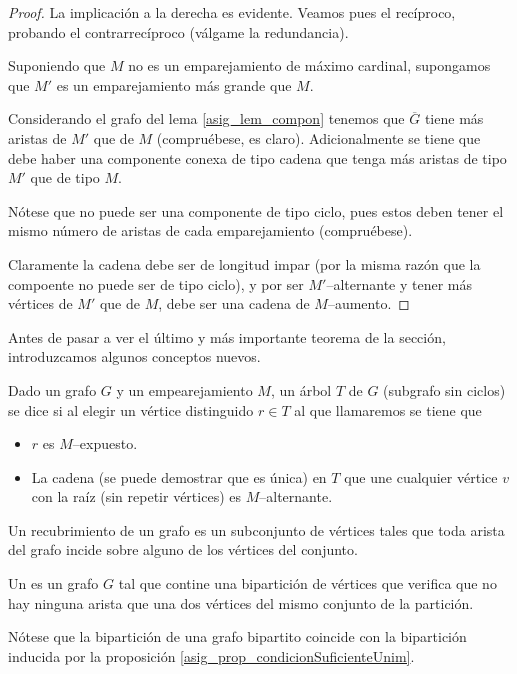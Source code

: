 \begin{proof}
	La implicación a la derecha es evidente. Veamos pues el recíproco, probando el contrarrecíproco (válgame la redundancia).
	
	Suponiendo que $M$ no es un emparejamiento de máximo cardinal, supongamos que $M'$ es un emparejamiento más grande que $M$.
	
	Considerando el grafo del lema \ref{asig_lem_compon} tenemos que $\overline{G}$ tiene más aristas de $M'$ que de $M$ (compruébese, es claro). Adicionalmente se tiene que debe haber una componente conexa de tipo cadena que tenga más aristas de tipo $M'$ que de tipo $M$.
	
	Nótese que no puede ser una componente de tipo ciclo, pues estos deben tener el mismo número de aristas de cada emparejamiento (compruébese).
	
	Claramente la cadena debe ser de longitud impar (por la misma razón que la compoente no puede ser de tipo ciclo), y por ser $M'$--alternante y tener más vértices de $M'$ que de $M$, debe ser una cadena de $M$--aumento. 
\end{proof}
Antes de pasar a ver el último y más importante teorema de la sección, introduzcamos algunos conceptos nuevos.
\begin{defi}
	Dado un grafo $G$ y un empearejamiento $M$, un árbol $T$ de $G$ (subgrafo sin ciclos) se dice  si al elegir un vértice distinguido $r\in T$ al que llamaremos  se tiene que
	\begin{itemize}
		\item $r$ es $M$--expuesto.
		\item La cadena (se puede demostrar que es única) en $T$ que une cualquier vértice $v$ con la raíz (sin repetir vértices) es $M$--alternante.
	\end{itemize}
\end{defi}
\begin{defi}[Recubrimiento]
	Un recubrimiento de un grafo es un subconjunto de vértices tales que toda arista del grafo incide sobre alguno de los vértices del conjunto.
\end{defi}
\begin{defi}
	Un  es un grafo $G$ tal que contine una bipartición de vértices que verifica que no hay ninguna arista que una dos vértices del mismo conjunto de la partición.
\end{defi}
\begin{obs}[Biparticiones]
	Nótese que la bipartición de una grafo bipartito coincide con la bipartición inducida por la proposición \ref{asig_prop_condicionSuficienteUnim}.
\end{obs}
